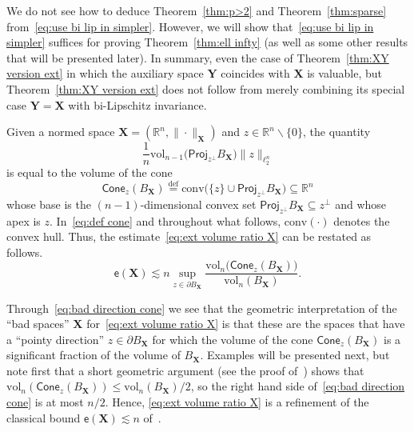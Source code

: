 \documentclass[11pt,reqno]{amsart}
\renewcommand{\le}{\leqslant}
\renewcommand{\setminus}{\smallsetminus}
\newcommand{\proj}{\mathsf{Proj}}
\newcommand{\X}{\mathbf X}
\newcommand{\Y}{\mathbf Y}
\newcommand{\R}{\mathbb R}
\theoremstyle{remark}
\renewcommand{\subset}{\subseteq}
\newcommand{\eqdef}{\stackrel{\mathrm{def}}{=}}
\newcommand{\ee}{\mathsf{e}}
\newcommand{\vol}{\mathrm{vol}}
\renewcommand{\1}{\mathbf 1}
\newcommand{\cone}{\mathsf{Cone}}
\newcommand{\conv}{\mathrm{conv}}
\begin{document}
We do  not see how to deduce Theorem~\ref{thm:p>2} and Theorem~\ref{thm:sparse} from~\eqref{eq:use bi lip in simpler}. However, we will show that~\eqref{eq:use bi lip in simpler}  suffices for proving Theorem~\ref{thm:ell infty} (as well as some other results that will be presented later). In summary, even the case of Theorem~\ref{thm:XY version ext} in which the auxiliary space $\Y$ coincides with $\X$ is valuable, but Theorem~\ref{thm:XY version ext} does not follow from merely combining  its special case $\Y=\X$ with bi-Lipschitz invariance.




Given a normed space $\X=(\R^n,\|\cdot\|_\X)$ and  $z\in \R^n\setminus\{0\}$, the quantity
\begin{equation}\label{eq:volume of cone}
\frac{1}{n}\vol_{n-1}\big(\proj_{z^\perp}B_{\X}\big)\|z\|_{\ell_2^n}
\end{equation}
is equal to the volume of the cone
\begin{equation}\label{eq:def cone}
\cone_z(B_{\X})\eqdef\conv \big(\{z\}\cup \proj_{z^\perp}B_{\X}\big)\subset \R^n
\end{equation}
whose base is the $(n-1)$-dimensional convex set $\proj_{z^\perp}B_{\X}\subset z^\perp$ and whose apex is $z$. In~\eqref{eq:def cone} and throughout what follows,  $\conv(\cdot)$ denotes the convex hull. Thus, the estimate~\eqref{eq:ext volume ratio X} can be restated as follows.
\begin{equation}\label{eq:bad direction cone}
\ee(\X)\lesssim n \sup_{z\in \partial B_{\X}} \frac{\vol_{n}\big(\cone_z(B_{\X})\big)}{\vol_n(B_{\X})}.
\end{equation}

Through~\eqref{eq:bad direction cone} we see that the geometric interpretation of the ``bad spaces'' $\X$ for~\eqref{eq:ext volume ratio X} is that these are the spaces that have a ``pointy direction'' $z\in \partial B_{\X}$ for which the volume of the cone  $\cone_z(B_{\X})$ is a significant fraction of the volume of $B_{\X}$. Examples will be presented next, but note first that  a short geometric argument  (see the proof of~\cite[Lemma~5.1]{GNS12}) shows that $\vol_n(\cone_z(B_{\X}))\le \vol_n(B_{\X})/2$, so the right hand side of~\eqref{eq:bad direction cone} is at most $n/2$. Hence, \eqref{eq:ext volume ratio X} is a refinement of the classical bound $\ee(\X)\lesssim n$ of~\cite{JLS86}.
\end{document}
